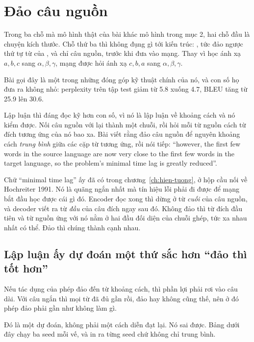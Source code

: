\section{Đảo câu nguồn}
\label{sec:ch05-dao-cau-nguon}

%
Trong ba chỗ mà mô hình thật của bài khác mô hình trong mục 2, hai chỗ đầu là
chuyện kích thước. Chỗ thứ ba thì không đụng gì tới kiến trúc:
, tức đảo ngược thứ tự từ của
, và chỉ câu nguồn, trước khi đưa vào mạng. Thay
vì học ánh xạ \(a, b, c\) sang \(\alpha, \beta, \gamma\), mạng được hỏi ánh xạ
\(c, b, a\) sang \(\alpha, \beta, \gamma\).

Bài gọi đây là một trong những đóng góp kỹ thuật chính của nó, và con số họ đưa
ra không nhỏ: perplexity trên tập test giảm từ 5.8 xuống 4.7, BLEU tăng từ 25.9
lên 30.6.

%
Lập luận thì đáng đọc kỹ hơn con số, vì nó là lập luận về khoảng cách và nó
kiểm được. Nối câu nguồn với  lại thành một
chuỗi, rồi hỏi mỗi từ nguồn
cách từ đích tương ứng của nó bao xa. Bài viết rằng đảo câu nguồn để nguyên
khoảng cách \emph{trung bình} giữa các cặp từ tương ứng, rồi nói tiếp:
\enquote{however, the first
few words in the source language are now very close to the first few words in
the target language, so the problem's minimal time lag is greatly reduced}.

Chữ \enquote{minimal time lag} ấy đã có trong chương~\ref{ch:hien-tuong}, ở hộp
cầu nối về Hochreiter 1991. Nó là quãng ngắn nhất mà tín hiệu lỗi phải đi được
để mạng bắt đầu học được cái gì đó. Encoder đọc xong thì dừng ở từ \emph{cuối}
của câu nguồn, và decoder viết ra từ \emph{đầu} của câu đích ngay sau đó. Không
đảo thì từ đích đầu tiên và từ nguồn ứng với nó nằm ở hai đầu đối diện của chuỗi
ghép, tức xa nhau nhất có thể. Đảo thì chúng thành cạnh nhau.

\subsection*{Lập luận ấy dự đoán một thứ sắc hơn \enquote{đảo thì tốt hơn}}

Nếu tác dụng của phép đảo đến từ khoảng cách, thì phần lợi phải rơi vào câu dài.
Với câu ngắn thì mọi từ đã đủ gần rồi, đảo hay không cũng thế, nên ở đó phép đảo
phải gần như không làm gì.

Đó là một dự đoán, không phải một cách diễn đạt lại. Nó sai được. Bảng dưới đây
chạy ba seed mỗi vế, và in ra từng seed chứ không chỉ trung bình.

